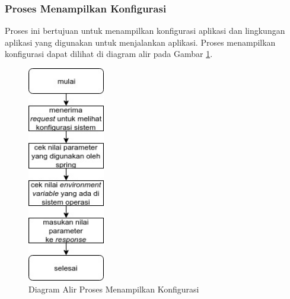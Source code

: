 \subsubsection{Proses Menampilkan Konfigurasi}
\par Proses ini bertujuan untuk menampilkan konfigurasi aplikasi dan lingkungan aplikasi yang digunakan untuk menjalankan aplikasi. Proses menampilkan konfigurasi dapat dilihat di diagram alir pada Gambar \ref{fc:konfigurasi}.
\begin{figure}[hb]
	\centering\includegraphics[width=0.3\textwidth]{bab3/flowchart/flowchart-menampilkan_konfigurasi.jpg}
	\caption{Diagram Alir Proses Menampilkan Konfigurasi} \label{fc:konfigurasi}
\end{figure}

